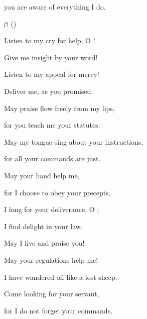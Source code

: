 {you are aware
of everything I do.
\par }{\SH ת ({})
\par }{\Q {}Listen to my cry for help, O
{}!
\par }{\Q Give me insight by your word!
\par }{\Q {}Listen to my appeal for mercy!
\par }{\Q Deliver
me, as you promised.
\par }{\Q {}May praise
flow freely
from my lips,
\par }{\Q for
you teach
me your statutes.
\par }{\Q {}May
my tongue
sing
about your instructions,
\par }{\Q for
all
your commands
are just.
\par }{\Q {}May
your hand
help
me,
\par }{\Q for
I choose
to obey your precepts.
\par }{\Q {}I long
for your deliverance,
O
{};
\par }{\Q I find delight
in your law.
\par }{\Q {}May I live
and praise
you!
\par }{\Q May your regulations
help me!
\par }{\Q {}I have wandered
off like a lost
sheep.
\par }{\Q Come looking
for your servant,
\par }{\Q for
I do not
forget
your commands.














\par }
